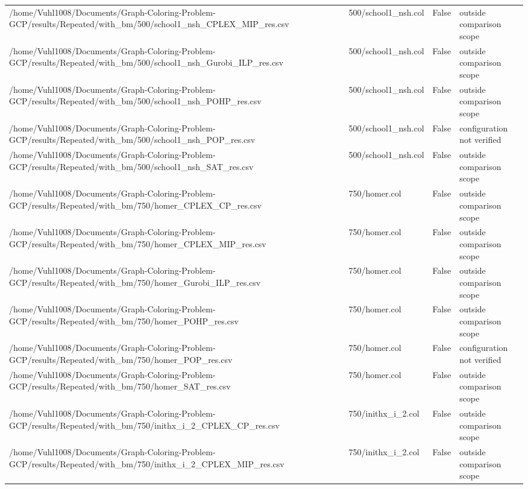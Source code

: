 \begin{table}[htbp]
\begin{tabular}{llll}
/home/Vuhl1008/Documents/Graph-Coloring-Problem-GCP/results/Repeated/with\_bm/500/school1\_nsh\_CPLEX\_MIP\_res.csv & 500/school1\_nsh.col & False & outside comparison scope \\
/home/Vuhl1008/Documents/Graph-Coloring-Problem-GCP/results/Repeated/with\_bm/500/school1\_nsh\_Gurobi\_ILP\_res.csv & 500/school1\_nsh.col & False & outside comparison scope \\
/home/Vuhl1008/Documents/Graph-Coloring-Problem-GCP/results/Repeated/with\_bm/500/school1\_nsh\_POHP\_res.csv & 500/school1\_nsh.col & False & outside comparison scope \\
/home/Vuhl1008/Documents/Graph-Coloring-Problem-GCP/results/Repeated/with\_bm/500/school1\_nsh\_POP\_res.csv & 500/school1\_nsh.col & False & configuration not verified \\
/home/Vuhl1008/Documents/Graph-Coloring-Problem-GCP/results/Repeated/with\_bm/500/school1\_nsh\_SAT\_res.csv & 500/school1\_nsh.col & False & outside comparison scope \\
/home/Vuhl1008/Documents/Graph-Coloring-Problem-GCP/results/Repeated/with\_bm/750/homer\_CPLEX\_CP\_res.csv & 750/homer.col & False & outside comparison scope \\
/home/Vuhl1008/Documents/Graph-Coloring-Problem-GCP/results/Repeated/with\_bm/750/homer\_CPLEX\_MIP\_res.csv & 750/homer.col & False & outside comparison scope \\
/home/Vuhl1008/Documents/Graph-Coloring-Problem-GCP/results/Repeated/with\_bm/750/homer\_Gurobi\_ILP\_res.csv & 750/homer.col & False & outside comparison scope \\
/home/Vuhl1008/Documents/Graph-Coloring-Problem-GCP/results/Repeated/with\_bm/750/homer\_POHP\_res.csv & 750/homer.col & False & outside comparison scope \\
/home/Vuhl1008/Documents/Graph-Coloring-Problem-GCP/results/Repeated/with\_bm/750/homer\_POP\_res.csv & 750/homer.col & False & configuration not verified \\
/home/Vuhl1008/Documents/Graph-Coloring-Problem-GCP/results/Repeated/with\_bm/750/homer\_SAT\_res.csv & 750/homer.col & False & outside comparison scope \\
/home/Vuhl1008/Documents/Graph-Coloring-Problem-GCP/results/Repeated/with\_bm/750/inithx\_i\_2\_CPLEX\_CP\_res.csv & 750/inithx\_i\_2.col & False & outside comparison scope \\
/home/Vuhl1008/Documents/Graph-Coloring-Problem-GCP/results/Repeated/with\_bm/750/inithx\_i\_2\_CPLEX\_MIP\_res.csv & 750/inithx\_i\_2.col & False & outside comparison scope \\

\end{tabular}
\end{table}
